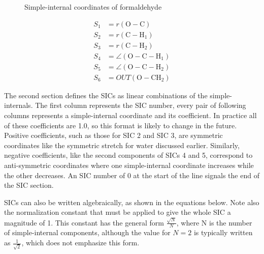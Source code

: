 \documentclass{article}
\begin{document}
\begin{figure}[ht]
  \centering
  \caption{Simple-internal coordinates of formaldehyde}
  \label{fig:h2co}

\end{figure}

\begin{align}
  S_1 &= r(\text{O}-\text{C}) \\
  S_2 &= r(\text{C}-\text{H}_1) \\
  S_3 &= r(\text{C}-\text{H}_2) \\
  S_4 &= \angle(\text{O}-\text{C}-\text{H}_1) \\
  S_5 &= \angle(\text{O}-\text{C}-\text{H}_2) \\
  S_6 &= OUT(\text{O}-\text{CH}_2)
\end{align}

The second section defines the SICs as linear combinations of the
simple-internals. The first column represents the SIC number, every pair of
following columns represents a simple-internal coordinate and its coefficient.
In practice all of these coefficients are 1.0, so this format is likely to
change in the future. Positive coefficients, such as those for SIC 2 and SIC 3,
are symmetric coordinates like the symmetric stretch for water discussed
earlier. Similarly, negative coefficients, like the second components of SICs 4
and 5, correspond to anti-symmetric coordinates where one simple-internal
coordinate increases while the other decreases. An SIC number of 0 at the start
of the line signals the end of the SIC section.

SICs can also be written algebraically, as shown in the equations below. Note
also the normalization constant that must be applied to give the whole SIC a
magnitude of 1. This constant has the general form $\frac{\sqrt{N}}{N}$, where N
is the number of simple-internal components, although the value for $N=2$ is
typically written as $\frac{1}{\sqrt{2}}$, which does not emphasize this form.
\end{document}
